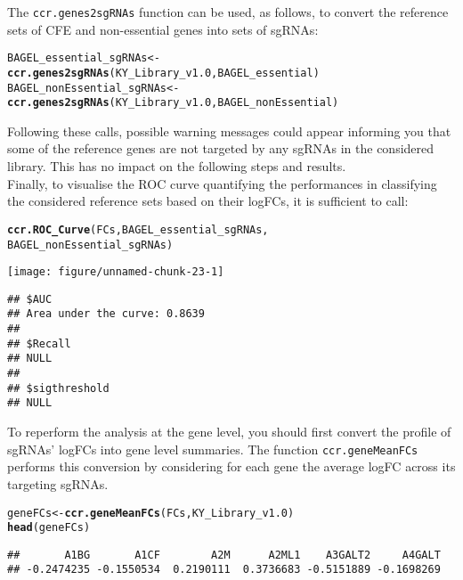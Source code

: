 \documentclass{article}\usepackage[]{graphicx}\usepackage[]{color}
\makeatletter
\def\maxwidth{ %
  \ifdim\Gin@nat@width>\linewidth
    \linewidth
  \else
    \Gin@nat@width
  \fi
}
\newcommand{\hlstd}[1]{\textcolor[rgb]{0.345,0.345,0.345}{#1}}%
\newcommand{\hlkwb}[1]{\textcolor[rgb]{0.69,0.353,0.396}{#1}}%
\newcommand{\hlkwd}[1]{\textcolor[rgb]{0.737,0.353,0.396}{\textbf{#1}}}%
\newenvironment{kframe}{%
 \def\at@end@of@kframe{}%
 \ifinner\ifhmode%
  \def\at@end@of@kframe{\end{minipage}}%
  \begin{minipage}{\columnwidth}%
 \fi\fi%
 \def\FrameCommand##1{\hskip\@totalleftmargin \hskip-\fboxsep
 \colorbox{shadecolor}{##1}\hskip-\fboxsep
     \hskip-\linewidth \hskip-\@totalleftmargin \hskip\columnwidth}%
 \MakeFramed {\advance\hsize-\width
   \@totalleftmargin\z@ \linewidth\hsize
   \@setminipage}}%
 {\par\unskip\endMakeFramed%
 \at@end@of@kframe}
\newenvironment{knitrout}{}{} %
\makeatother
\begin{document}
The \texttt{ccr.genes2sgRNAs} function can be used, as follows, to convert the reference sets of CFE and non-essential genes into sets of sgRNAs:



\begin{knitrout}
\color{fgcolor}\begin{kframe}
\begin{alltt}
\hlstd{BAGEL_essential_sgRNAs}\hlkwb{<-}
    \hlkwd{ccr.genes2sgRNAs}\hlstd{(KY_Library_v1.0,BAGEL_essential)}
\hlstd{BAGEL_nonEssential_sgRNAs}\hlkwb{<-}
    \hlkwd{ccr.genes2sgRNAs}\hlstd{(KY_Library_v1.0,BAGEL_nonEssential)}
\end{alltt}
\end{kframe}
\end{knitrout}



Following these calls, possible warning messages could appear informing you that some of the reference genes are not targeted by any sgRNAs in the considered library. This has no impact on the following steps and results.\\

Finally, to visualise the ROC curve quantifying the performances in classifying the considered reference sets based on their logFCs, it is sufficient to call:
\begin{knitrout}
\color{fgcolor}\begin{kframe}
\begin{alltt}
\hlkwd{ccr.ROC_Curve}\hlstd{(FCs,BAGEL_essential_sgRNAs,}
                              \hlstd{BAGEL_nonEssential_sgRNAs)}
\end{alltt}
\end{kframe}
\texttt{[image: figure/unnamed-chunk-23-1]} 
\begin{kframe}\begin{verbatim}
## $AUC
## Area under the curve: 0.8639
## 
## $Recall
## NULL
## 
## $sigthreshold
## NULL
\end{verbatim}
\end{kframe}
\end{knitrout}
% 
To reperform the analysis at the gene level, you should first convert the profile of sgRNAs' logFCs into gene level summaries. The function \texttt{ccr.geneMeanFCs} performs this conversion by considering for each gene the average logFC across its targeting sgRNAs.

\begin{knitrout}
\color{fgcolor}\begin{kframe}
\begin{alltt}
\hlstd{geneFCs}\hlkwb{<-}\hlkwd{ccr.geneMeanFCs}\hlstd{(FCs,KY_Library_v1.0)}
\hlkwd{head}\hlstd{(geneFCs)}
\end{alltt}
\begin{verbatim}
##       A1BG       A1CF        A2M      A2ML1    A3GALT2     A4GALT 
## -0.2474235 -0.1550534  0.2190111  0.3736683 -0.5151889 -0.1698269
\end{verbatim}
\end{kframe}
\end{knitrout}
\end{document}
